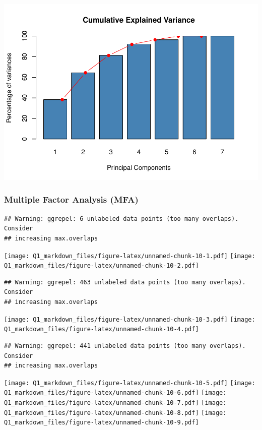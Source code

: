 \documentclass[
]{article}
\begin{document}
\includegraphics{Q1_markdown_files/figure-latex/unnamed-chunk-9-4.pdf}

\hypertarget{multiple-factor-analysis-mfa}{%
\subsubsection{Multiple Factor Analysis
(MFA)}\label{multiple-factor-analysis-mfa}}

\begin{verbatim}
## Warning: ggrepel: 6 unlabeled data points (too many overlaps). Consider
## increasing max.overlaps
\end{verbatim}

\texttt{[image: Q1\_markdown\_files/figure-latex/unnamed-chunk-10-1.pdf]}
\texttt{[image: Q1\_markdown\_files/figure-latex/unnamed-chunk-10-2.pdf]}

\begin{verbatim}
## Warning: ggrepel: 463 unlabeled data points (too many overlaps). Consider
## increasing max.overlaps
\end{verbatim}

\texttt{[image: Q1\_markdown\_files/figure-latex/unnamed-chunk-10-3.pdf]}
\texttt{[image: Q1\_markdown\_files/figure-latex/unnamed-chunk-10-4.pdf]}

\begin{verbatim}
## Warning: ggrepel: 441 unlabeled data points (too many overlaps). Consider
## increasing max.overlaps
\end{verbatim}

\texttt{[image: Q1\_markdown\_files/figure-latex/unnamed-chunk-10-5.pdf]}
\texttt{[image: Q1\_markdown\_files/figure-latex/unnamed-chunk-10-6.pdf]}
\texttt{[image: Q1\_markdown\_files/figure-latex/unnamed-chunk-10-7.pdf]}
\texttt{[image: Q1\_markdown\_files/figure-latex/unnamed-chunk-10-8.pdf]}
\texttt{[image: Q1\_markdown\_files/figure-latex/unnamed-chunk-10-9.pdf]}
\end{document}

